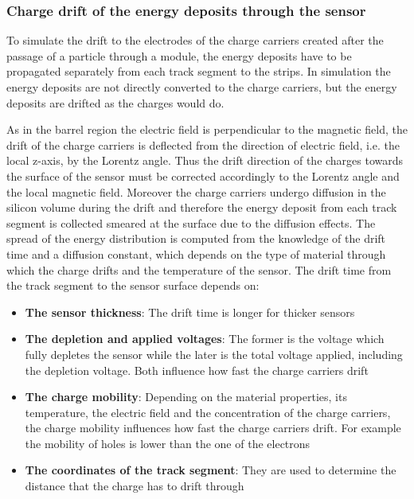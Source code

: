 \subsubsection{Charge drift of the energy deposits through the sensor~\label{sec:drift}}

To simulate  the drift to the electrodes of the charge carriers created after the passage of a particle through a module, the energy deposits have to be propagated separately from each track segment to the strips. In simulation the energy deposits are not directly converted to the charge carriers, but the energy deposits are drifted as the charges would do. 

As in the barrel region the electric field is perpendicular to the magnetic field, the drift of the charge carriers is deflected from the direction of electric field, i.e. the local z-axis, by the Lorentz angle. Thus the drift direction of the charges towards the surface of the sensor must be corrected accordingly to the Lorentz angle and the local magnetic field. Moreover the charge carriers undergo diffusion in the silicon volume during the drift and therefore the energy deposit from each track segment is collected smeared at the surface due to the diffusion effects. The spread of the energy distribution is computed from the knowledge of the drift time and a diffusion constant, which depends on the type of material through which the charge drifts and the temperature of the sensor. The drift time from the track segment to the sensor surface depends on:

\begin{itemize}
\item \textbf{The sensor thickness}: The drift time is longer for thicker sensors
\item \textbf{The depletion and applied voltages}:  The former is the voltage which fully depletes the sensor while the later is the total voltage applied, including the depletion voltage. Both influence how fast the charge carriers drift
\item \textbf{The charge mobility}: Depending on the material properties, its temperature, the electric field and the concentration of the charge carriers, the charge mobility influences how fast the charge carriers drift. For example the mobility of holes is lower than the one of the electrons
\item \textbf{The coordinates of the track segment}: They are used to determine the distance that the charge  has to drift through
\end{itemize}


